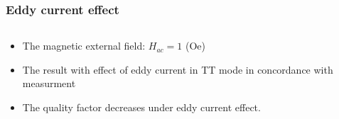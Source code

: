 \documentclass[compress]{beamer}
\begin{document}
\begin{frame}\frametitle{Eddy current effect}
\begin{columns}[totalwidth=\textwidth]
 \begin{column}{.59\textwidth}
\begin{itemize}[label=$\bullet$, font=\small, leftmargin=*]
\item The magnetic external field: $H_{ac}=1$ (Oe)
\item The result with effect of eddy current in TT mode in concordance with measurment 
\item The quality factor decreases under eddy current effect.

\end{itemize}
\end{column}
\end{columns}
\end{frame}
\end{document}
